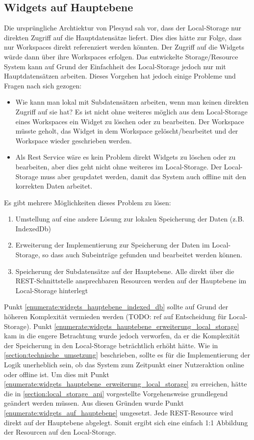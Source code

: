\subsection{Widgets auf Hauptebene}
Die ursprüngliche Archtiektur von Plesynd sah vor, dass der Local-Storage nur direkten Zugriff auf die Hauptdatensätze liefert. Dies dies hätte zur Folge, dass nur Workspaces direkt referenziert werden könnten. Der Zugriff auf die Widgets würde dann über ihre Workspaces erfolgen. Das entwickelte Storage/Resource System kann auf Grund der Einfachheit des Local-Storage jedoch nur mit Hauptdatensätzen arbeiten. Dieses Vorgehen hat jedoch einige Probleme und Fragen nach sich gezogen: 
\begin{itemize}
 \item Wie kann man lokal mit Subdatensätzen arbeiten, wenn man keinen direkten Zugriff auf sie hat? Es ist nicht ohne weiteres möglich aus dem Local-Storage eines Workspaces ein Widget zu löschen oder zu bearbeiten. Der Workspace müsste geholt, das Widget in dem Workspace gelöscht/bearbeitet und der Workspace wieder geschrieben werden. 
 \item Als Rest Service wäre es kein Problem direkt Widgets zu löschen oder zu bearbeiten, aber dies geht nicht ohne weiteres im Local-Storage. Der Local-Storage muss aber geupdatet werden, damit das System auch offline mit den korrekten Daten arbeitet.
\end{itemize} 

Es gibt mehrere Möglichkeiten dieses Problem zu lösen:
\begin{enumerate}
 \item\label{enumerate:widgets_hauptebene_indexed_db} Umstellung auf eine andere Lösung zur lokalen Speicherung der Daten (z.B. IndexedDb)
 \item\label{enumerate:widgets_hauptebene_erweiterung_local_storage} Erweiterung der Implementierung zur Speicherung der Daten im Local-Storage, so dass auch Subeinträge gefunden und bearbeitet werden können.
 \item\label{enumerate:widgets_auf_hauptebene} Speicherung der Subdatensätze auf der Hauptebene. Alle direkt über die REST-Schnittstelle ansprechbaren Resourcen werden auf der Hauptebene im Local-Storage hinterlegt
\end{enumerate}
Punkt \ref{enumerate:widgets_hauptebene_indexed_db} sollte auf Grund der höheren Komplexität vermieden werden (TODO: ref auf Entscheidung für Local-Storage). Punkt \ref{enumerate:widgets_hauptebene_erweiterung_local_storage} kam in die engere Betrachtung wurde jedoch verworfen, da er die Komplexität der Speicherung in den Local-Storage beträchtlich erhöht hätte. Wie in \ref{section:technische_umsetzung} beschrieben, sollte es für die Implementierung der Logik unerheblich sein, ob das System zum Zeitpunkt einer Nutzeraktion online oder offline ist. Um dies mit Punkt \ref{enumerate:widgets_hauptebene_erweiterung_local_storage} zu erreichen, hätte die in \ref{section:local_storage_api} vorgestellte Vorgehensweise grundlegend geändert werden müssen. Aus diesen Gründen wurde Punkt \ref{enumerate:widgets_auf_hauptebene} umgesetzt. Jede REST-Resource wird direkt auf der Hauptebene abgelegt. Somit ergibt sich eine einfach 1:1 Abbildung der Resourcen auf den Local-Storage. 

